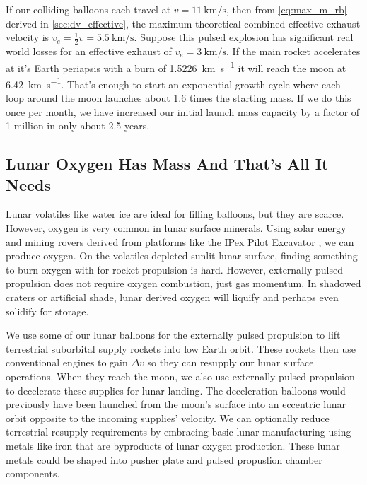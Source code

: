 \documentclass{article}
\begin{document}
{If our colliding balloons each travel at $v=\SI{11}{\kilo\meter\per\second}$, then from \autoref{eq:max_m_rb} derived in \autoref{sec:dv_effective},  the maximum theoretical combined effective exhaust velocity is $v_e = \frac{1}{2}v = \SI {5.5}{\kilo\meter\per\second}$.  Suppose this pulsed explosion has significant real world losses for an effective exhaust of $v_e = \SI{3}{\kilo\meter\per\second}$.   If the main rocket accelerates at it's Earth periapsis with a burn of \SI{1.5226}{\kilo\meter\per\second} it will reach the moon at \SI{6.42}{\kilo\meter\per\second}.   That's enough to start an exponential growth cycle where each loop around the moon launches about 1.6 times the starting mass.   If we do this once per month, we have increased our initial launch mass capacity by a factor of 1 million in only about 2.5 years. 

\subsection{Lunar Oxygen Has Mass And That's All It Needs}\label{sec:lunar_mining}
Lunar volatiles like water ice are ideal for filling balloons, but they are scarce.   However, oxygen is very common in lunar surface minerals.   Using solar energy and mining rovers derived from platforms like the IPex Pilot Excavator \cite{ipex_pilot_excavator}, we can produce oxygen.  On the volatiles depleted sunlit lunar surface, finding something to burn oxygen with for rocket propulsion is hard.   However, externally pulsed propulsion does not require oxygen combustion, just gas momentum.  In shadowed craters or artificial shade, lunar derived oxygen will liquify and perhaps even solidify for storage.  

We use some of our lunar balloons for the externally pulsed propulsion to lift terrestrial suborbital supply rockets into low Earth orbit.  These rockets then use conventional engines to gain \(\Delta v\) so they can resupply our lunar surface operations.   When they reach the moon, we also use externally pulsed propulsion to decelerate these supplies for lunar landing.  The deceleration balloons would previously have been launched from the moon's surface into an eccentric lunar orbit opposite to the incoming supplies' velocity.   We can optionally reduce terrestrial resupply requirements by embracing basic lunar manufacturing using metals like iron that are byproducts of lunar oxygen production.  These lunar metals could be shaped into pusher plate and pulsed propuslion chamber components.  

}
\end{document}
